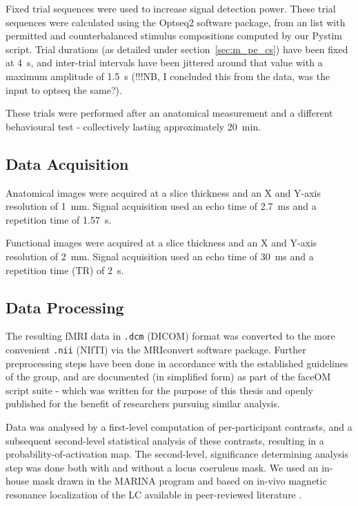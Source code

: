	    Fixed trial sequences were used to increase signal detection power.
	    These trial sequences were calculated using the Optseq2 \citep{optseq} software package, from an list with permitted and counterbalanced stimulus compositions computed by our Pystim\citep{pystim} script.
	    Trial durations (as detailed under section~\ref{sec:m_pe_cs}) have been fixed at \SI{4}{\second}, and inter-trial intervals have been jittered around that value with a maximum amplitude of \SI{1.5}{\second} (!!!NB, I concluded this from the data, was the input to optseq the same?). 
	    
	    These trials were performed after an anatomical measurement and a different behavioural test - collectively lasting approximately \SI{20}{\minute}.
	\subsection{Data Acquisition}
	    Anatomical images were acquired at a slice thickness and an X and Y-axis resolution of \SI{1}{\milli\metre}.
	    Signal acquisition used an echo time of \SI{2.7}{\milli\second} and a repetition time of \SI{1.57}{\second}.
	
	    Functional images were acquired at a slice thickness and an X and Y-axis resolution of \SI{2}{\milli\metre}.
	    Signal acquisition used an echo time of \SI{30}{\milli\second} and a repetition time (TR) of \SI{2}{\second}.
	\subsection{Data Processing}
	    The resulting fMRI data in \colorbox{vlg}{\texttt{.dcm}} (DICOM) format was converted to the more convenient \colorbox{vlg}{\texttt{.nii}} (NIfTI) via the MRIconvert \citep{MRIconvert} software package.
	    Further preprocessing steps have been done in accordance with the established guidelines of the group, and are documented (in simplified form) as part of the faceOM script suite \citep{faceOM} - which was written for the purpose of this thesis and openly published for the benefit of researchers pursuing similar analysis.
	    
	    Data was analysed by a first-level computation of per-participant contrasts, and a subsequent second-level statistical analysis of these contrasts, resulting in a probability-of-activation map.
	    The second-level, significance determining analysis step was done both with and without a locus coeruleus mask.
	    We used an in-house mask drawn in the MARINA program \citep{Walter2003} and based on in-vivo magnetic resonance localization of the LC available in peer-reviewed literature \citep{Keren2009}.
	    
